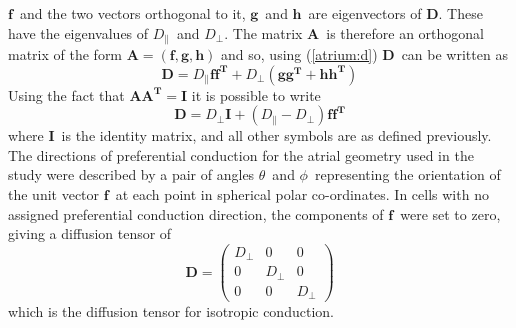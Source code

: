 $\mathbf{f}$\ and the two vectors orthogonal to it, $\mathbf{g}$\ and
$\mathbf{h}$\ are eigenvectors of $\mathbf{D}$.
These have the eigenvalues of $D_{\parallel}$\ and $D_{\perp}$.
The matrix $\mathbf{A}$\ is therefore an orthogonal matrix of the form
$\mathbf{A} = \left(\mathbf{f},\mathbf{g},\mathbf{h}\right)$ and so, using
(\ref{atrium:d}) $\mathbf{D}$\ can be written as
\begin{equation}
\label{atrium:dfgh}
\mathbf{D} = D_{\parallel}\mathbf{f}\mathbf{f^{T}} +
D_{\perp}\left(\mathbf{g}\mathbf{g^{T}} + \mathbf{h}\mathbf{h^{T}}\right)
\end{equation}
Using the fact that $\mathbf{A}\mathbf{A^T} = \mathbf{I}$ it is possible to
write
\begin{equation}
\label{atrium:dwithf}
\mathbf{D} = D_{\perp}\mathbf{I} + \left(D_{\parallel}-D_{\perp}\right)\mathbf{f}\mathbf{f^{T}}
\end{equation}
where $\mathbf{I}$\ is the identity matrix, and all other symbols are as defined
previously.
The directions of preferential conduction for the atrial geometry used in the
study were described by a pair of angles $\theta$\ and $\phi$\ representing the
orientation of the unit vector $\mathbf{f}$\ at each point in spherical polar
co-ordinates.
In cells with no assigned preferential conduction direction, the components of
$\mathbf{f}$\ were set to zero, giving a diffusion tensor of
\begin{equation}
\label{atrium:dnofibre}
\mathbf{D} =
\begin{pmatrix}
D_{\perp} & 0 & 0\\
0 & D_{\perp} & 0\\
0 & 0 & D_{\perp}
\end{pmatrix}
\end{equation}
which is the diffusion tensor for isotropic conduction.

